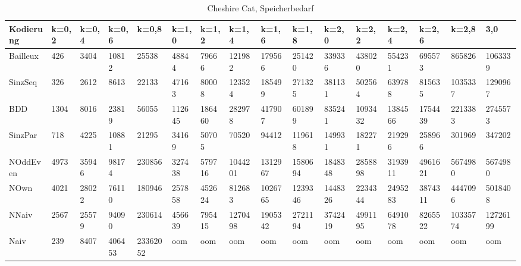 \documentclass[a4,abstract=on]{scrartcl}
\begin{document}
\begin{landscape}
\begin{table}[h!]
   \end{table}
 \begin{table}[h!]
    \small
    \setlength{\tabcolsep}{0.11cm}
     \centering
     \begin{tabular}[width=\textwidth]{|l|l|l|l|l|l|l|l|l|l|l|l|l|l|l|l|}
	\hline
       \textbf{Kodierung}  & \textbf{k=0,2} & \textbf{k=0,4} & \textbf{k=0,6} &\textbf{k=0,8} &\textbf{k=1,0} &\textbf{k=1,2} &\textbf{k=1,4} &\textbf{k=1,6} &\textbf{k=1,8} &\textbf{k=2,0} &\textbf{k=2,2} &\textbf{k=2,4} &\textbf{k=2,6} &\textbf{k=2,8} & \textbf{3,0}\\
	\hline
	Bailleux & 426 & 3404 & 10812 & 25538 & 48844 & 79666 & 121982 & 179566 & 251420 & 339336 & 438020 & 554231 & 695573 & 865826 & 1063339\\
\hline
	SinzSeq & 326 & 2612 & 8613 & 22133 & 47163 & 80008 & 123524 & 185499 & 271325 & 381131 & 502564 & 639788 & 815635 & 1035337 & 1290967 \\
\hline
	BDD & 1304 & 8016 & 23819 & 56055 & 112645 & 186460 & 282978 &417907 &601899 & 835241 & 1093432 & 1384566 & 1754439 & 2213383 & 2745573\\
\hline
	SinzPar & 718 & 4225 & 10881 & 21295 & 34169 & 50705 & 70520 & 94412 & 119618 & 149931 & 182271 & 219296 & 258966 & 301969  & 347202 \\
\hline
	NOddEven & 4973 & 35946 & 98174 & 230856 & 327438 & 579716 & 1044201 & 1312967 & 1580694 & 1848348& 2858898 & 3193911 & 4961621 & 5674980 & 5674980\\
\hline
	NOwn & 4021 & 28022 & 76110 & 180946 & 257858 & 452624 & 812683 & 1026765 & 1239346 & 1448326 & 2234344 & 2495283  & 3874311 & 4447096 & 5018408\\
 \hline
	NNaiv & 2567 & 25579 & 94090 & 230614 & 456639 & 795415 & 1270498 & 1905342 & 2721194 & 3742419 & 4991195 & 6491078 & 8265522 & 10335774 & 12726199\\
\hline
	Naiv & 239 & 8407 &  406453 &  23362052 &  oom &  oom &  oom &  oom &  oom &  oom &  oom &  oom &  oom &  oom & oom\\
\hline
       
     \end{tabular}

     \caption{Cheshire Cat, Speicherbedarf}
     \label{tbl:beispieltabelle}

   \end{table}


\end{landscape}
\end{document}
